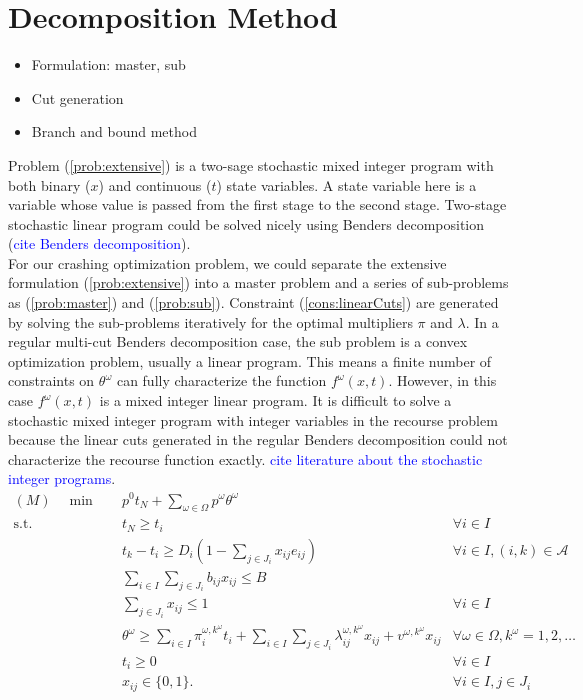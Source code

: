 \documentclass[11pt]{article}
\begin{document}
\section{Decomposition Method} \label{sec:decomposition}
	\begin{itemize}
		\item Formulation: master, sub
		\item Cut generation
		\item Branch and bound method
	\end{itemize}
	Problem (\ref{prob:extensive}) is a two-sage stochastic mixed integer program with both binary (\(x\)) and continuous (\(t\)) state variables. A state variable here is a variable whose value is passed from the first stage to the second stage. Two-stage stochastic linear program could be solved nicely using Benders decomposition (\textcolor{blue}{cite Benders decomposition}). \\
	\newline 
	For our crashing optimization problem, we could separate the extensive formulation (\ref{prob:extensive}) into a master problem and a series of sub-problems as (\ref{prob:master}) and (\ref{prob:sub}). Constraint (\ref{cons:linearCuts}) are generated by solving the sub-problems iteratively for the optimal multipliers \(\pi\) and \(\lambda\). In a regular multi-cut Benders decomposition case, the sub problem is a convex optimization problem, usually a linear program. This means a finite number of constraints on \(\theta^\omega\) can fully characterize the function \(f^\omega(x,t)\). However, in this case \(f^\omega(x,t)\) is a mixed integer linear program. It is difficult to solve a stochastic mixed integer program with integer variables in the recourse problem because the linear cuts generated in the regular Benders decomposition could not characterize the recourse function exactly. \textcolor{blue}{cite literature about the stochastic integer programs}.
	\begin{subequations}
		\label{prob:master}
		\begin{align}
		(M) \quad \min \quad & p^0 t_N + \sum_{\omega \in \Omega} p^\omega \theta^\omega & \\
		\text{s.t.} \quad & t_N \geq t_i & \forall i \in I\\
		& t_k - t_i \geq D_{i}(1 - \sum_{j \in J_i} x_{ij} e_{ij}) & \forall i \in I, (i,k) \in \mathcal{A}\\
		& \sum_{i \in I} \sum_{j \in J_i} b_{ij}x_{ij} \leq B & \\
		& \sum_{j \in J_i} x_{ij} \leq 1 & \forall i \in I\\
		& \theta^\omega \geq \sum_{i \in I} \pi_i^{\omega,k^\omega} t_i + \sum_{i \in I} \sum_{j \in J_i} \lambda_{ij}^{\omega,k^\omega} x_{ij} + v^{\omega,k^\omega} x_{ij} & \forall \omega \in \Omega, k^\omega = 1,2, \dots \label{cons:linearCuts}\\
		& t_i \geq 0 & \forall i \in I\\
		& x_{ij} \in \{0,1\}. & \forall i \in I, j \in J_i&
		\end{align}
	\end{subequations}
\end{document}
